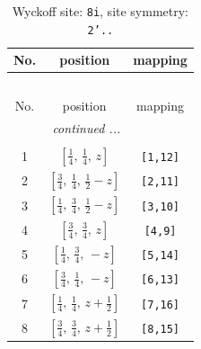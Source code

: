 \documentclass[fleqn,8pt]{jsarticle}
\begin{document}
\begin{longtable}{ccc}
\caption{Wyckoff site: {\tt 8i}, site symmetry: {\tt 2'..}}
 \\
 \hline \hline
No. & position & mapping \\ \hline \endfirsthead

\multicolumn{2}{l}{\tablename\ \thetable{}} \\
 \hline \hline
No. & position & mapping \\ \hline \endhead

 \hline \hline
\multicolumn{2}{r}{\footnotesize\it continued ...} \\ \endfoot

 \hline \hline
\multicolumn{2}{r}{} \\ \endlastfoot

1 & $\left[ \frac{1}{4},\, \frac{1}{4},\, z \right]$ & {\tt [1,12]} \\ \hline
2 & $\left[ \frac{3}{4},\, \frac{1}{4},\, \frac{1}{2} - z \right]$ & {\tt [2,11]} \\ \hline
3 & $\left[ \frac{1}{4},\, \frac{3}{4},\, \frac{1}{2} - z \right]$ & {\tt [3,10]} \\ \hline
4 & $\left[ \frac{3}{4},\, \frac{3}{4},\, z \right]$ & {\tt [4,9]} \\ \hline
5 & $\left[ \frac{1}{4},\, \frac{3}{4},\, - z \right]$ & {\tt [5,14]} \\ \hline
6 & $\left[ \frac{3}{4},\, \frac{1}{4},\, - z \right]$ & {\tt [6,13]} \\ \hline
7 & $\left[ \frac{1}{4},\, \frac{1}{4},\, z + \frac{1}{2} \right]$ & {\tt [7,16]} \\ \hline
8 & $\left[ \frac{3}{4},\, \frac{3}{4},\, z + \frac{1}{2} \right]$ & {\tt [8,15]} \\
\end{longtable}
\renewcommand{\arraystretch}{1.2}
\end{document}
